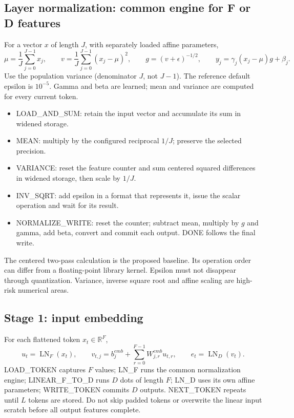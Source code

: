 \subsection{Layer normalization: common engine for F or D features}
For a vector $x$ of length $J$, with separately loaded affine parameters,
\[
\mu=\frac{1}{J}\sum_{j=0}^{J-1}x_j,\qquad
v=\frac{1}{J}\sum_{j=0}^{J-1}(x_j-\mu)^2,\qquad
g=(v+\epsilon)^{-1/2},\qquad
y_j=\gamma_j(x_j-\mu)g+\beta_j.
\]
Use the population variance (denominator $J$, not $J-1$). The reference default epsilon is $10^{-5}$. Gamma and beta are learned; mean and variance are computed for every current token.
\begin{itemize}
\item LOAD\_AND\_SUM: retain the input vector and accumulate its sum in widened storage.
\item MEAN: multiply by the configured reciprocal $1/J$; preserve the selected precision.
\item VARIANCE: reset the feature counter and sum centered squared differences in widened storage, then scale by $1/J$.
\item INV\_SQRT: add epsilon in a format that represents it, issue the scalar operation and wait for its result.
\item NORMALIZE\_WRITE: reset the counter; subtract mean, multiply by $g$ and gamma, add beta, convert and commit each output. DONE follows the final write.
\end{itemize}
The centered two-pass calculation is the proposed baseline. Its operation order can differ from a floating-point library kernel. Epsilon must not disappear through quantization. Variance, inverse square root and affine scaling are high-risk numerical areas.

\subsection{Stage 1: input embedding}
For each flattened token $x_t\in\mathbb{R}^{F}$,
\[
u_t=\operatorname{LN}_{F}(x_t),\qquad
v_{t,j}=b^{emb}_j+\sum_{r=0}^{F-1}W^{emb}_{j,r}u_{t,r},\qquad
e_t=\operatorname{LN}_{D}(v_t).
\]
LOAD\_TOKEN captures $F$ values; LN\_F runs the common normalization engine; LINEAR\_F\_TO\_D runs $D$ dots of length $F$; LN\_D uses its own affine parameters; WRITE\_TOKEN commits $D$ outputs. NEXT\_TOKEN repeats until $L$ tokens are stored. Do not skip padded tokens or overwrite the linear input scratch before all output features complete.

